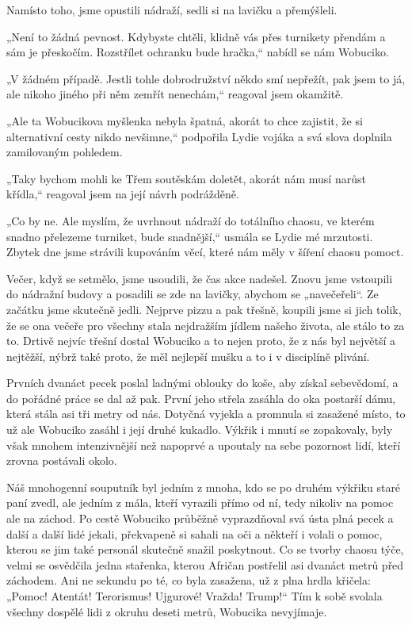 Namísto toho, jsme opustili nádraží, sedli si na lavičku a přemýšleli.
	
„Není to žádná pevnost. Kdybyste chtěli, klidně vás přes turnikety přendám a sám je přeskočím. Rozstřílet ochranku bude hračka,“ nabídl se nám Wobuciko.
	
„V žádném případě. Jestli tohle dobrodružství někdo smí nepřežít, pak jsem to já, ale nikoho jiného při něm zemřít nenechám,“ reagoval jsem okamžitě.
	
„Ale ta Wobucikova myšlenka nebyla špatná, akorát to chce zajistit, že si alternativní cesty nikdo nevšimne,“ podpořila Lydie vojáka a svá slova doplnila zamilovaným pohledem. 
	
„Taky bychom mohli ke Třem soutěskám doletět, akorát nám musí narůst křídla,“ reagoval jsem na její návrh podrážděně.

„Co by ne. Ale myslím, že uvrhnout nádraží do totálního chaosu, ve kterém snadno přelezeme turniket, bude snadnější,“ usmála se Lydie mé mrzutosti. Zbytek dne jsme strávili kupováním věcí, které nám měly v šíření chaosu pomoct.

Večer, když se setmělo, jsme usoudili, že čas akce nadešel. Znovu jsme vstoupili do nádražní budovy a posadili se zde na lavičky, abychom se „navečeřeli“. Ze začátku jsme skutečně jedli. Nejprve pizzu a pak třešně, koupili jsme si jich tolik, že se ona večeře pro všechny stala nejdražším jídlem našeho života, ale stálo to za to. Drtivě nejvíc třešní dostal Wobuciko a to nejen proto, že z nás byl největší a nejtěžší, nýbrž také proto, že měl nejlepší mušku a to i v disciplíně plivání.

Prvních dvanáct pecek poslal ladnými oblouky do koše, aby získal sebevědomí, a do pořádné práce se dal až pak. První jeho střela zasáhla do oka postarší dámu, která stála asi tři metry od nás. Dotyčná vyjekla a promnula si zasažené místo, to už ale Wobuciko zasáhl i její druhé kukadlo. Výkřik i mnutí se zopakovaly, byly však mnohem intenzivnější než napoprvé a upoutaly na sebe pozornost lidí, kteří zrovna postávali okolo.

Náš mnohogenní souputník byl jedním z mnoha, kdo se po druhém výkřiku staré paní zvedl, ale jedním z mála, kteří vyrazili přímo od ní, tedy nikoliv na pomoc ale na záchod. Po cestě Wobuciko  průběžně vyprazdňoval svá ústa plná pecek a další a další lidé jekali, překvapeně si sahali na oči a někteří i volali o pomoc, kterou se jim také personál skutečně snažil poskytnout. Co se tvorby chaosu týče, velmi se osvědčila jedna stařenka, kterou Afričan postřelil asi dvanáct metrů před záchodem. Ani ne sekundu po té, co byla zasažena, už z plna hrdla křičela: „Pomoc! Atentát! Terorismus! Ujgurové! Vražda! Trump!“ Tím k sobě svolala všechny dospělé lidi z okruhu deseti metrů, Wobucika nevyjímaje.

